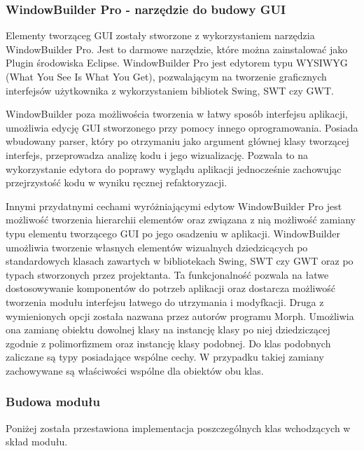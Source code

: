 \subsubsection{WindowBuilder Pro - narzędzie do budowy GUI}
Elementy tworząceg GUI zostały stworzone z wykorzystaniem narzędzia WindowBuilder Pro. Jest to darmowe narzędzie, które można zainstalować jako Plugin środowiska Eclipse. WindowBuilder Pro jest edytorem typu WYSIWYG (What You See Is What You Get), pozwalającym na tworzenie graficznych interfejsów użytkownika z wykorzystaniem bibliotek Swing, SWT czy GWT. 

WindowBuilder poza możliwościa tworzenia w łatwy sposób interfejsu aplikacji, umożliwia edycję GUI stworzonego przy pomocy innego oprogramowania. Posiada wbudowany parser, który po otrzymaniu jako argument głównej klasy tworzącej interfejs, przeprowadza analizę kodu i jego wizualizację. Pozwala to na wykorzystanie edytora do poprawy wyglądu aplikacji jednocześnie zachowując przejrzystość kodu w wyniku ręcznej refaktoryzacji.

Innymi przydatnymi cechami wyróżniającymi edytow WindowBuilder Pro jest możliwość tworzenia hierarchii elementów oraz związana z nią
możliwość zamiany typu elementu tworzącego GUI po jego osadzeniu w aplikacji. WindowBuilder umożliwia tworzenie własnych elementów wizualnych dziedzicących po standardowych klasach zawartych w bibliotekach Swing, SWT czy GWT oraz po typach stworzonych przez projektanta. Ta funkcjonalność pozwala na łatwe dostosowywanie komponentów do potrzeb aplikacji oraz dostarcza możliwość tworzenia modułu interfejsu łatwego do utrzymania i modyfkacji.
Druga z wymienionych opcji została nazwana przez autorów programu Morph. Umożliwia ona zamianę obiektu dowolnej klasy na instancję klasy po niej dziedziczącej zgodnie z polimorfizmem oraz instancję klasy podobnej. Do klas podobnych zaliczane są typy posiadające wspólne cechy. W przypadku takiej zamiany zachowywane są właściwości wspólne dla obiektów obu klas. 

\subsubsection{Budowa modułu}
Poniżej została przestawiona implementacja poszczególnych klas wchodzących w skład modułu.
